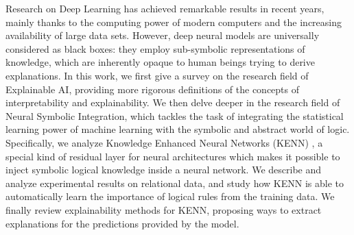 
Research on Deep Learning has achieved remarkable results in recent years, mainly thanks to the computing power of modern computers and the increasing availability of large data sets. However, deep neural models are universally considered as black boxes: they employ sub-symbolic representations of knowledge, which are inherently opaque to human beings trying to derive explanations. In this work, we first give a survey on the research field of Explainable AI, providing more rigorous definitions of the concepts of interpretability and explainability.
We then delve deeper in the research field of Neural Symbolic Integration, which tackles the task of integrating the statistical learning power of machine learning with the symbolic and abstract world of logic. Specifically, we analyze Knowledge Enhanced Neural Networks (KENN) \cite{daniele2019kenn}, a special kind of residual layer for neural architectures which makes it possible to inject symbolic logical knowledge inside a neural network. We describe and analyze experimental results on relational data, and study how KENN is able to automatically learn the importance of logical rules from the training data. We finally review explainability methods for KENN, proposing ways to extract explanations for the predictions provided by the model.
